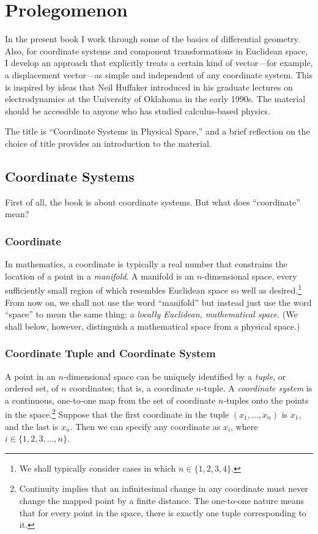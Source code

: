 

\chapter{Prolegomenon}

In the present book I work through some of the basics of differential geometry.
Also, for coordinate systems and component transformations in Euclidean space,
I develop an approach that explicitly treats a certain kind of vector---for
example, a displacement vector---as simple and independent of any coordinate
system.  This is inspired by ideas that Neil Huffaker introduced in his
graduate lectures on electrodynamics at the University of Oklahoma in the early
1990s.  The material should be accessible to anyone who has studied
calculus-based physics.

The title is ``Coordinate Systems in Physical Space,'' and a brief reflection
on the choice of title provides an introduction to the material.

\section{Coordinate Systems}

First of all, the book is about coordinate systems.  But what does
``coordinate'' mean?

\subsection{Coordinate}

In mathematics, a coordinate is typically a real number that constrains the
location of a point in a \emph{manifold}.  A manifold is an $n$-dimensional
space, every sufficiently small region of which resembles Euclidean space so
well as desired.\footnote{%
   We shall typically consider cases in which $n \in \{1, 2, 3, 4\}$.%
}
From now on, we shall not use the word ``manifold'' but instead just use the
word ``space'' to mean the same thing: a \emph{locally Euclidean, mathematical
space}.  (We shall below, however, distinguish a mathematical space from a
physical space.)

\subsection{Coordinate Tuple and Coordinate System}

A point in an $n$-dimensional space can be uniquely identified by a
\emph{tuple}, or ordered set, of $n$ coordinates; that is, a coordinate
$n$-tuple.  A \emph{coordinate system} is a continuous, one-to-one map from the
set of coordinate $n$-tuples onto the points in the space.\footnote{%
   Continuity implies that an infinitesimal change in any coordinate must never
   change the mapped point by a finite distance.  The one-to-one nature means
   that for every point in the space, there is exactly one tuple corresponding
   to it.%
}
Suppose that the first coordinate in the tuple $(x_1, \ldots, x_n)$ is $x_1$,
and the last is $x_n$.  Then we can specify any coordinate as $x_i$, where $i
\in \{1, 2, 3, \ldots, n\}$.

